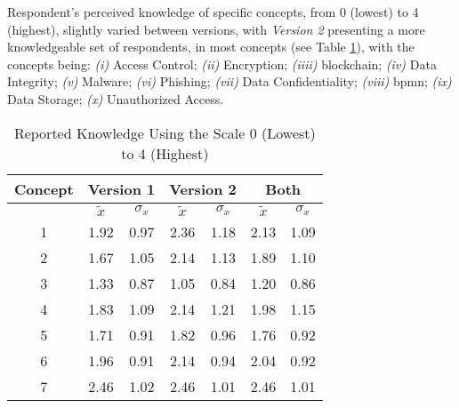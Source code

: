 Respondent's perceived knowledge of specific concepts, from 0 (lowest) to 4 (highest), slightly varied between versions, with \textit{Version 2} presenting a more knowledgeable set of respondents, in most concepts (see Table \ref{tab: knowledge}), with the concepts being: \emph{(i)} Access Control; \emph{(ii)} Encryption; \emph{(iiii)} blockchain; \emph{(iv)} Data Integrity; \emph{(v)} Malware; \emph{(vi)} Phishing; \emph{(vii)} Data Confidentiality; \emph{(viii)} \gls{bpmn}; \emph{(ix)} Data Storage; \emph{(x)} Unauthorized Access.

\begin{table}[htb]
	\centering
	\caption{Reported Knowledge Using the Scale 0 (Lowest) to 4 (Highest)}
	\label{tab: knowledge}
	\begin{tabular}{c|cccc|cc}
		\hline
		\bf Concept & \multicolumn{2}{c}{\bf Version 1} & \multicolumn{2}{c}{\bf Version 2} \vrule & \multicolumn{2}{c}{\bf Both}                                             \\
		\hline
		            & $\tilde{x}$                       & $\sigma_{x}$                             & $\tilde{x}$                  & $\sigma_{x}$ & $\tilde{x}$ & $\sigma_{x}$ \\
		\hline
		1           & 1.92                              & 0.97                                     & 2.36                         & 1.18         & 2.13        & 1.09         \\
		2           & 1.67                              & 1.05                                     & 2.14                         & 1.13         & 1.89        & 1.10         \\
		3           & 1.33                              & 0.87                                     & 1.05                         & 0.84         & 1.20        & 0.86         \\
		4           & 1.83                              & 1.09                                     & 2.14                         & 1.21         & 1.98        & 1.15         \\
		5           & 1.71                              & 0.91                                     & 1.82                         & 0.96         & 1.76        & 0.92         \\
		6           & 1.96                              & 0.91                                     & 2.14                         & 0.94         & 2.04        & 0.92         \\
		7           & 2.46                              & 1.02                                     & 2.46                         & 1.01         & 2.46        & 1.01         \\

\end{tabular}
\end{table}
